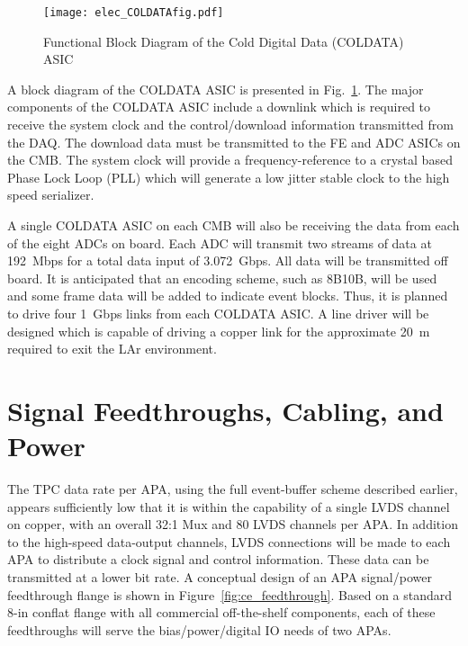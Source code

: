 \begin{figure}[htbp]
\centering
\texttt{[image: elec\_COLDATAfig.pdf]}
\caption{Functional Block Diagram of the Cold Digital Data (COLDATA) ASIC}
\label{fig:elec_COLDATAfig}
\end{figure}
A block diagram of the COLDATA ASIC is presented in Fig.~\ref{fig:elec_COLDATAfig}.
The major components of the COLDATA ASIC include a downlink which is required to receive the system clock and
the control/download information transmitted from the DAQ.
The download data must be transmitted to the FE and ADC ASICs on the CMB.
The system clock will provide a frequency-reference to a crystal based Phase Lock Loop (PLL)
which will generate a low jitter stable clock to the high speed serializer. 

A single COLDATA ASIC on each CMB will also be receiving the data from each of the eight ADCs on board.
Each ADC will transmit two streams of data at 192~Mbps for a total data input of 3.072~Gbps.
All data will be transmitted off board.
It is anticipated that an encoding scheme, such as 8B10B, will be used and
some frame data will be added to indicate event blocks.
Thus, it is planned to drive four 1~Gbps links from each COLDATA ASIC.
A line driver will be designed which is capable of driving a copper link for the approximate 20~m required
to exit the LAr environment. 

%
\section{Signal Feedthroughs, Cabling, and Power}
\label{sec:ce_feedthrough}

The TPC data rate per APA, using the full event-buffer scheme described earlier,
appears sufficiently low that it is within the capability of a single LVDS channel on copper,
with an overall 32:1 Mux and 80 LVDS channels per APA.
In addition to the high-speed data-output channels,
LVDS connections will be made to each APA to distribute a clock signal and control information.
These data can be transmitted at a lower bit rate.
A conceptual design of an APA signal/power feedthrough flange is shown in Figure~\ref{fig:ce_feedthrough}.
Based on a standard 8-in conflat flange with all commercial off-the-shelf components,
each of these feedthroughs will serve the bias/power/digital IO needs of two APAs.  


